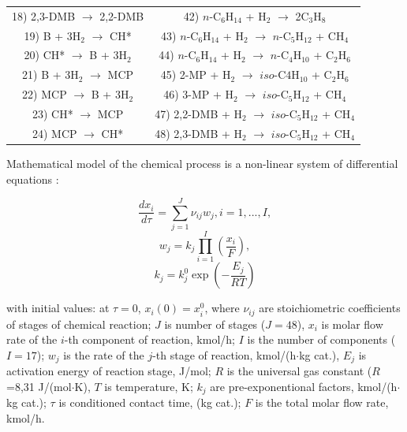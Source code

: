 \documentclass[mathematics,article,submit,pdftex,moreauthors]{Definitions/mdpi}
\begin{document}
\begin{table}[H]
\begin{tabularx}{\textwidth}{CC}
18) 2,3-DMB $\rightarrow$ 2,2-DMB & 42) $n$-C$_6$H$_{14}$ + H$_2$ $\rightarrow$ 2C$_3$H$_8$ \\
19) B + 3H$_2$ $\rightarrow$ CH*  & 43) $n$-C$_6$H$_{14}$ + H$_2$ $\rightarrow$ $n$-C$_5$H$_{12}$ + CH$_4$ \\
20) CH* $\rightarrow$ B + 3H$_2$ & 44) $n$-C$_6$H$_{14}$ + H$_2$ $\rightarrow$ $n$-C$_4$H$_{10}$ + C$_2$H$_6$ \\
21) B + 3H$_2$ $\rightarrow$ MCP  & 45) 2-MP + H$_2$ $\rightarrow$ $iso$-C$4$H$_{10}$ + C$_2$H$_6$ \\
22) MCP $\rightarrow$ B + 3H$_2$  & 46) 3-MP + H$_2$ $\rightarrow$ $iso$-C$_5$H$_{12}$ + CH$_4$ \\
23) CH* $\rightarrow$ MCP & 47) 2,2-DMB + H$_2$ $\rightarrow$ $iso$-C$_5$H$_{12}$ + CH$_4$ \\
24) MCP $\rightarrow$ CH*  & 48) 2,3-DMB + H$_2$ $\rightarrow$ $iso$-C$_5$H$_{12}$ + CH$_4$ \\
\bottomrule
\end{tabularx}
\end{table}

Mathematical model of the chemical process is a non-linear system of differential equations \cite{Koledina2016KineticsAM,enik2021,logan}:
\begin{linenomath}
\begin{equation}\label{eq_concentrations}
\dfrac{dx_i}{d\tau} = \sum_{j=1}^J \nu_{ij} w_j, i = 1,...,I,
\end{equation}
\begin{equation}\label{eq_rate}
w_{j} = k_j \prod_{i=1}^I \left( \dfrac{x_i}{F} \right),
\end{equation}
\begin{equation}\label{eq_constant}
k_j = k^0_j \exp \left( -\dfrac{E_j}{RT} \right)
\end{equation}
\end{linenomath}
with initial values: at $\tau = 0$, $x_i(0) = x_i^0$, where $\nu_{ij}$ are stoichiometric coefficients of stages of chemical reaction; $J$ is number of stages ($J = 48$), $x_i$ is molar flow rate of the $i$-th component of reaction, kmol/h; $I$ is the number of components ($I = 17$); $w_j$ is the rate of the $j$-th stage of reaction, kmol/(h$\cdot$kg cat.), $E_j$ is activation energy of reaction stage, J/mol; $R$ is the universal gas constant ($R$=8,31 J/(mol$\cdot$K), $T$ is temperature, K; $k_j$ are pre-exponentional factors, kmol/(h$\cdot$kg cat.); $\tau$ is conditioned contact time, (kg cat.); $F$ is the total molar flow rate, kmol/h.
\end{document}
